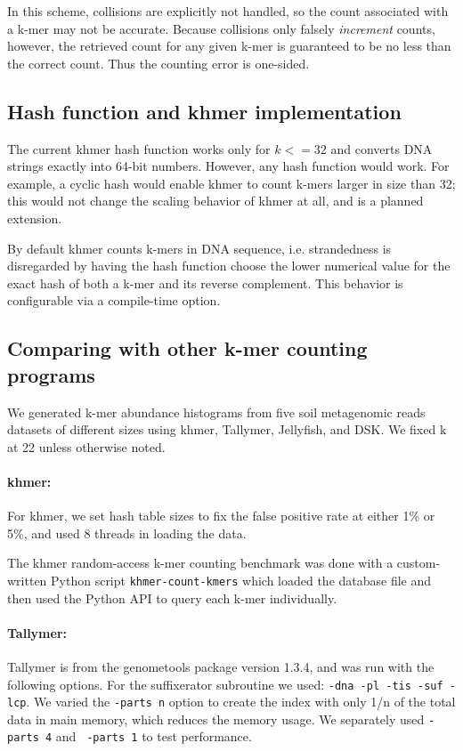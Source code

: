 \documentclass{article}
\begin{document}
In this scheme, collisions are explicitly not handled, so the count
associated with a k-mer may not be accurate. Because collisions only
falsely {\em increment} counts, however, the retrieved count for any
given k-mer is guaranteed to be no less than the correct count.  Thus
the counting error is one-sided.

\subsection{Hash function and khmer implementation}

The current khmer hash function works only for $k <= 32$ and converts
DNA strings exactly into 64-bit numbers.  However, any hash function
would work. For example, a cyclic hash would enable khmer to count
k-mers larger in size than 32; this would not change the scaling
behavior of khmer at all, and is a planned extension.

By default khmer counts k-mers in DNA sequence, i.e. strandedness is
disregarded by having the hash function choose the lower numerical
value for the exact hash of both a k-mer and its reverse complement.
This behavior is configurable via a compile-time option.

\subsection{Comparing with other k-mer counting programs}

We generated k-mer abundance histograms from five soil metagenomic reads
datasets of different sizes using khmer, Tallymer, Jellyfish, and DSK.
We fixed k at 22 unless otherwise noted.

\paragraph{khmer:}
For khmer, we set hash table sizes to fix the false positive rate at
either 1\% or 5\%, and used 8 threads in loading the data.

The khmer random-access k-mer counting benchmark was done with a
custom-written Python script {\tt khmer-count-kmers} which loaded the
database file and then used the Python API to query each k-mer
individually.

\paragraph{Tallymer:}
Tallymer is from the genometools package version 1.3.4, and was run
with the following options. For the suffixerator subroutine we used:
{\tt -dna -pl -tis -suf -lcp}.  We varied the {\tt -parts n} option to
create the index with only 1/n of the total data in main memory, which
reduces the memory usage.  We separately used {\tt -parts 4} and {\tt
  -parts 1} to test performance.
\end{document}
